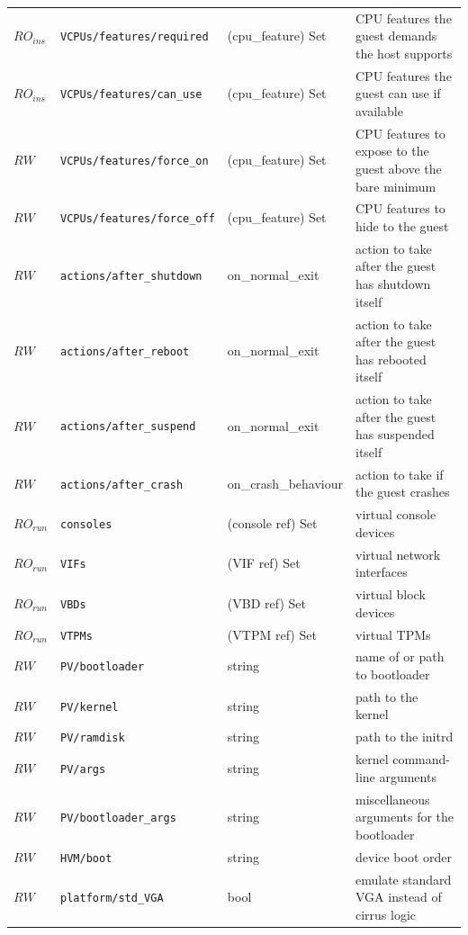 \begin{longtable}{|lllp{}|}
$\mathit{RO}_\mathit{ins}$ &  {\tt VCPUs/features/required} & (cpu\_feature) Set & CPU features the guest demands the host supports \\
$\mathit{RO}_\mathit{ins}$ &  {\tt VCPUs/features/can\_use} & (cpu\_feature) Set & CPU features the guest can use if available \\
$\mathit{RW}$ &  {\tt VCPUs/features/force\_on} & (cpu\_feature) Set & CPU features to expose to the guest above the bare minimum \\
$\mathit{RW}$ &  {\tt VCPUs/features/force\_off} & (cpu\_feature) Set & CPU features to hide to the guest \\
$\mathit{RW}$ &  {\tt actions/after\_shutdown} & on\_normal\_exit & action to take after the guest has shutdown itself \\
$\mathit{RW}$ &  {\tt actions/after\_reboot} & on\_normal\_exit & action to take after the guest has rebooted itself \\
$\mathit{RW}$ &  {\tt actions/after\_suspend} & on\_normal\_exit & action to take after the guest has suspended itself \\
$\mathit{RW}$ &  {\tt actions/after\_crash} & on\_crash\_behaviour & action to take if the guest crashes \\
$\mathit{RO}_\mathit{run}$ &  {\tt consoles} & (console ref) Set & virtual console devices \\
$\mathit{RO}_\mathit{run}$ &  {\tt VIFs} & (VIF ref) Set & virtual network interfaces \\
$\mathit{RO}_\mathit{run}$ &  {\tt VBDs} & (VBD ref) Set & virtual block devices \\
$\mathit{RO}_\mathit{run}$ &  {\tt VTPMs} & (VTPM ref) Set & virtual TPMs \\
$\mathit{RW}$ &  {\tt PV/bootloader} & string & name of or path to bootloader \\
$\mathit{RW}$ &  {\tt PV/kernel} & string & path to the kernel \\
$\mathit{RW}$ &  {\tt PV/ramdisk} & string & path to the initrd \\
$\mathit{RW}$ &  {\tt PV/args} & string & kernel command-line arguments \\
$\mathit{RW}$ &  {\tt PV/bootloader\_args} & string & miscellaneous arguments for the bootloader \\
$\mathit{RW}$ &  {\tt HVM/boot} & string & device boot order \\
$\mathit{RW}$ &  {\tt platform/std\_VGA} & bool & emulate standard VGA instead of cirrus logic \\

\end{longtable}
